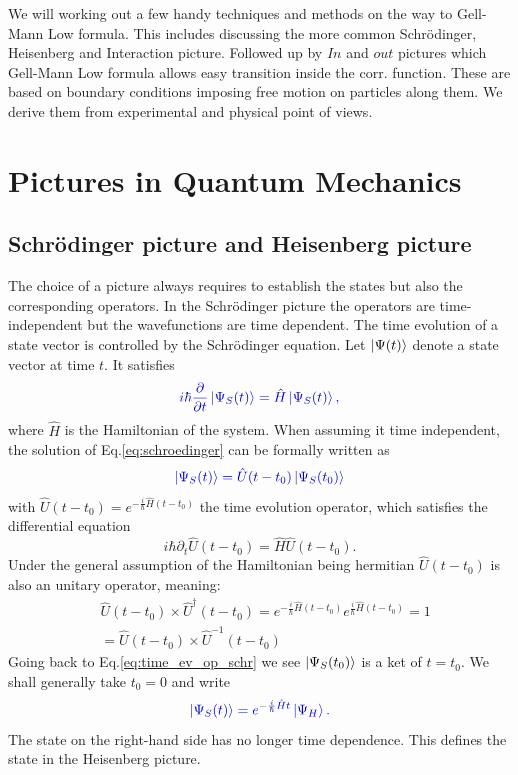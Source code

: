 \documentclass[12pt, titlepage]{article}
\begin{document}
We will working out a few handy techniques and methods on the way to Gell-Mann Low formula. This includes discussing the more common Schrödinger, Heisenberg and Interaction picture. Followed up by $ In $ and $ out $ pictures which Gell-Mann Low formula allows easy transition inside the corr. function. These are based on boundary conditions imposing free motion on particles along them. We derive them from experimental and physical point of views.
\section{Pictures in Quantum Mechanics }\label{Pictures in Quantum Mechanics}
\subsection{Schrödinger picture and Heisenberg picture}\label{SHpicture}
The choice of a picture always requires to establish the states but also the corresponding operators. 
In the Schrödinger picture the operators are time-independent but the wavefunctions are time dependent. The time evolution of a state vector is controlled by the Schrödinger equation. Let $ \ket{\Psi(t)} $ denote a state vector at time $ t $. It satisfies
\begin{equation}\label{eq:schroedinger}
\textcolor[RGB]{0,0,204}{
i \hbar \frac{\partial }{\partial t} \ket{\Psi_{S}(t)} =
\hat{H} \ket{\Psi_{S}(t)},
}
\end{equation}
where $ \hat{H} $ is the Hamiltonian of the system. When assuming it time independent, the solution of Eq.\enskip\eqref{eq:schroedinger} can be formally written as 
\begin{equation}\label{eq:time_ev_op_schr}
\textcolor[RGB]{0,0,204}{
\ket{\Psi_{S}(t)} 
=\hat{U}(t-t_{0})\ket{\Psi_{S}(t_0)}
}
\end{equation}
with $ \hat{U}(t-t_{0}) = e^{-\frac{i}{\hbar}\hat{H}(t-t_{0})} $ the time evolution operator, which satisfies the differential equation 
\begin{equation}\label{evo_U_1}
i\hbar\partial_{t}\hat{U}(t-t_{0})=\hat{H}\hat{U}(t-t_{0})
. 
\end{equation}
Under the general assumption of the Hamiltonian being hermitian $ \hat{U}(t-t_{0}) $  is also an unitary operator, meaning:
\begin{equation}\label{Unitary_U}
\begin{split}
&\hat{U}(t-t_{0}) \times \hat{U}^{\dagger}(t-t_{0}) = e^{-\frac{i}{\hbar}\hat{H}(t-t_{0})} e^{\frac{i}{\hbar}\hat{H}(t-t_{0})}=1
\\
&=\hat{U}(t-t_{0}) \times \hat{U}^{-1}(t-t_{0})
\end{split}
\end{equation}
 Going back to Eq.\enskip\eqref{eq:time_ev_op_schr} we see $ \ket{\Psi_{S}(t_0)} $ is a ket of $ t=t_{0} $. We shall generally take $ t_{0}=0 $ and write
\begin{equation}\label{eq:phi_s_and_phi_h}
\textcolor[RGB]{0,0,204}{
\ket{\Psi_{S}(t)} 
= e^{-\frac{i}{\hbar}\hat{H}t}
\ket{\Psi_{H}}.
}
\end{equation}
The state on the right-hand side has no longer time dependence. This defines the  state in the Heisenberg picture.
\end{document}
